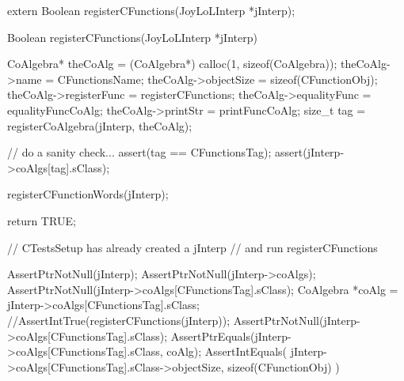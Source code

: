 \startTestSuite[registerCFunctions]

\startCHeader
extern Boolean registerCFunctions(JoyLoLInterp *jInterp);
\stopCHeader
{}

\startCCode
Boolean registerCFunctions(JoyLoLInterp *jInterp) {
  CoAlgebra* theCoAlg    = (CoAlgebra*) calloc(1, sizeof(CoAlgebra));
  theCoAlg->name         = CFunctionsName;
  theCoAlg->objectSize   = sizeof(CFunctionObj);
  theCoAlg->registerFunc = registerCFunctions;
  theCoAlg->equalityFunc = equalityFuncCoAlg;
  theCoAlg->printStr     = printFuncCoAlg;
  size_t tag = registerCoAlgebra(jInterp, theCoAlg);

  // do a sanity check...
  assert(tag == CFunctionsTag);
  assert(jInterp->coAlgs[tag].sClass);
  
  registerCFunctionWords(jInterp);
  
  return TRUE;
}
\stopCCode


\startCTest
  // CTestsSetup has already created a jInterp
  // and run registerCFunctions
  
  AssertPtrNotNull(jInterp);
  AssertPtrNotNull(jInterp->coAlgs);
  AssertPtrNotNull(jInterp->coAlgs[CFunctionsTag].sClass);
  CoAlgebra *coAlg = jInterp->coAlgs[CFunctionsTag].sClass;
  //AssertIntTrue(registerCFunctions(jInterp));
  AssertPtrNotNull(jInterp->coAlgs[CFunctionsTag].sClass);
  AssertPtrEquals(jInterp->coAlgs[CFunctionsTag].sClass, coAlg);
  AssertIntEquals(
    jInterp->coAlgs[CFunctionsTag].sClass->objectSize,
    sizeof(CFunctionObj)
  )
\stopCTest
\stopTestCase
\stopTestSuite